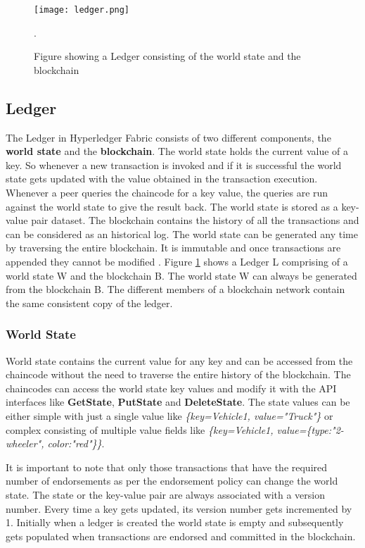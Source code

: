 \documentclass[
  a4paper,  %
  twoside,  %
  bibliography=totoc,
  headsepline,
  cleardoublepage=empty,
  parskip=half,
  draft=false
]{scrbook}
\begin{document}
\begin{figure}[h!]
\begin{center}
\texttt{[image: ledger.png]}
\caption{Figure showing a Ledger consisting of the world state and the blockchain \cite{Ledger}}.
\label{figure:ledger}
\end{center}
\end{figure}

\subsection{Ledger}
The Ledger in Hyperledger Fabric consists of two different components, the \textbf{world state} and the \textbf{blockchain}. The world state holds the current value of a key. So whenever a new transaction is invoked and if it is successful the world state gets updated with the value obtained in the transaction execution. Whenever a peer queries the chaincode for a key value, the queries are run against the world state to give the result back. The world state is stored as a key-value pair dataset. The blockchain contains the history of all the transactions and can be considered as an historical log. The world state can be generated any time by traversing the entire blockchain. It is immutable and once transactions are appended they cannot be modified \cite{Ledger} \cite{HF}. Figure \ref{figure:ledger} shows a Ledger L comprising of a world state W and the blockchain B. The world state W can always be generated from the blockchain B. The different members of a blockchain network contain the same consistent copy of the ledger.

\subsubsection{World State}
World state contains the current value for any key and can be accessed from the chaincode without the need to traverse the entire history of the blockchain. The chaincodes can access the world state key values and modify it with the API interfaces like \textbf{GetState}, \textbf{PutState} and \textbf{DeleteState}. The state values can be either simple with just a single value like \textit{\{key=Vehicle1, value="Truck"\}} or complex consisting of multiple value fields like \textit{\{key=Vehicle1, value=\{type:"2-wheeler", color:"red"\}\}}. 

It is important to note that only those transactions that have the required number of endorsements as per the endorsement policy can change the world state. The state or the key-value pair are always associated with a version number. Every time a key gets updated, its version number gets incremented by 1. Initially when a ledger is created the world state is empty and subsequently gets populated when transactions are endorsed and committed in the blockchain\cite{Ledger}.
\end{document}
